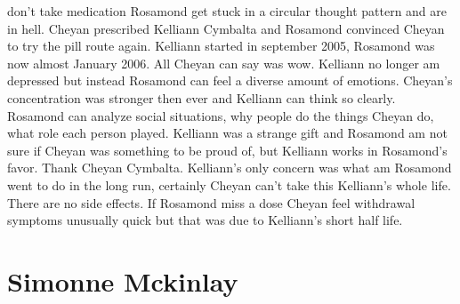 \documentclass[12pt]{book}
\begin{document}
don't take medication Rosamond get stuck in a circular thought pattern and are in hell. Cheyan prescribed Kelliann Cymbalta and Rosamond convinced Cheyan to try the pill route again. Kelliann started in september 2005, Rosamond was now almost January 2006. All Cheyan can say was wow. Kelliann no longer am depressed but instead Rosamond can feel a diverse amount of emotions. Cheyan's concentration was stronger then ever and Kelliann can think so clearly. Rosamond can analyze social situations, why people do the things Cheyan do, what role each person played. Kelliann was a strange gift and Rosamond am not sure if Cheyan was something to be proud of, but Kelliann works in Rosamond's favor. Thank Cheyan Cymbalta. Kelliann's only concern was what am Rosamond went to do in the long run, certainly Cheyan can't take this Kelliann's whole life. There are no side effects. If Rosamond miss a dose Cheyan feel withdrawal symptoms unusually quick but that was due to Kelliann's short half life.



\chapter{Simonne Mckinlay}
\end{document}
